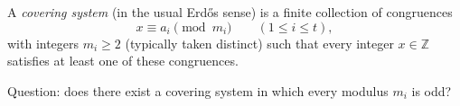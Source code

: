 A \emph{covering system} (in the usual Erd\H{o}s sense) is a finite collection of congruences
\[
 x\equiv a_i\pmod{m_i}\qquad (1\le i\le t),
\]
with integers $m_i\ge 2$ (typically taken distinct) such that every integer $x\in\mathbb{Z}$ satisfies at least one of these congruences.

Question: does there exist a covering system in which every modulus $m_i$ is odd?
